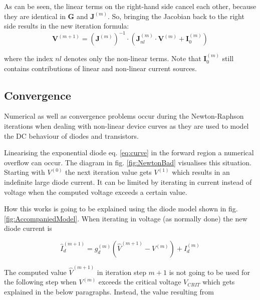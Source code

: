 As can be seen, the linear terms on the right-hand side cancel
each other, because they are identical in $\boldsymbol{G}$
and $\boldsymbol{J}^{(m)}$. So, bringing the Jacobian back
to the right side results in the new iteration formula:
\begin{equation}
\boldsymbol{V}^{(m+1)} = \left( \boldsymbol{J}^{(m)} \right)^{-1} \cdot
  \left( \boldsymbol{J}_{nl}^{(m)}\cdot \boldsymbol{V}^{(m)} + \boldsymbol{I}_{0}^{(m)} \right)
\end{equation}

where the index $nl$ denotes only the non-linear terms. Note
that $\boldsymbol{I}_{0}^{(m)}$ still contains contributions of linear
and non-linear current sources.


\subsection{Convergence}
\label{sec:convergenceDC}

Numerical as well as convergence problems occur during the
Newton-Raphson iterations when dealing with non-linear device curves
as they are used to model the DC behaviour of diodes and transistors.

\addvspace{12pt}

Linearising the exponential diode eq. \eqref{eq:curve} in the forward
region a numerical overflow can occur.  The diagram in
fig. \ref{fig:NewtonBad} visualises this situation.  Starting with
$V^{(0)}$ the next iteration value gets $V^{(1)}$ which results in an
indefinite large diode current.  It can be limited by iterating in
current instead of voltage when the computed voltage exceeds a certain
value.

\addvspace{12pt}

How this works is going to be explained using the diode model shown in
fig. \ref{fig:AccompaniedModel}.  When iterating in voltage (as
normally done) the new diode current is

\begin{equation}
\hat{I}_{d}^{(m+1)} = g_{d}^{(m)} \left(\hat{V}^{(m+1)} - V^{(m)}\right) + I_{d}^{(m)}
\end{equation}

The computed value $\hat{V}^{(m+1)}$ in iteration step $m+1$ is not
going to be used for the following step when $V^{(m)}$ exceeds the
critical voltage $V_{CRIT}$ which gets explained in the below
paragraphs.  Instead, the value resulting from

